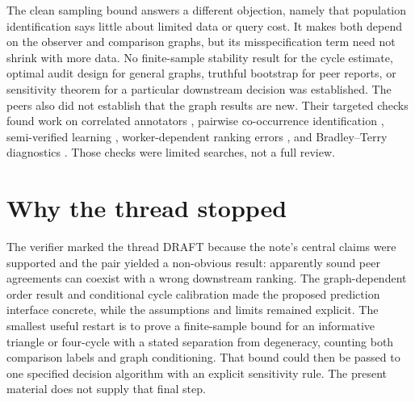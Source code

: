 \documentclass{article}
\begin{document}
The clean sampling bound answers a different objection, namely that population identification says little
about limited data or query cost. It makes both depend on the observer and comparison graphs, but its
misspecification term need not shrink with more data. No finite-sample stability result for the cycle
estimate, optimal audit design for general graphs, truthful bootstrap for peer reports, or sensitivity theorem
for a particular downstream decision was established. The peers also did not establish that the graph results
are new. Their targeted checks found work on correlated annotators \cite{li2019}, pairwise co-occurrence
identification \cite{ibrahim2019}, semi-verified learning \cite{meister2018}, worker-dependent ranking errors
\cite{crowdbt}, and Bradley--Terry diagnostics \cite{btdiagnostics}. Those checks were limited searches, not a
full review.

\section{Why the thread stopped}

The verifier marked the thread DRAFT because the note's central claims were supported and the pair yielded a
non-obvious result: apparently sound peer agreements can coexist with a wrong downstream ranking. The
graph-dependent order result and conditional cycle calibration made the proposed prediction interface
concrete, while the assumptions and limits remained explicit. The smallest useful restart is to prove a
finite-sample bound for an informative triangle or four-cycle with a stated separation from degeneracy,
counting both comparison labels and graph conditioning. That bound could then be passed to one specified
decision algorithm with an explicit sensitivity rule. The present material does not supply that final step.



\end{document}
